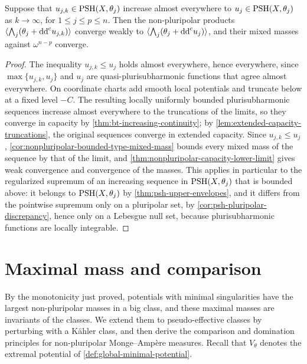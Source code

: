 \begin{corollary}\label{cor:nonpluripolar-increasing-continuity}
Suppose that $u_{j,k}\in\mathrm{PSH}(X,\theta_j)$ increase almost everywhere to $u_j\in\mathrm{PSH}(X,\theta_j)$ as $k\to\infty$, for $1\leq j\leq p\leq n$. Then the non-pluripolar products $\langle\bigwedge_j(\theta_j+\mathrm{dd}^{\mathrm{c}} u_{j,k})\rangle$ converge weakly to $\langle\bigwedge_j(\theta_j+\mathrm{dd}^{\mathrm{c}} u_j)\rangle$, and their mixed masses against $\omega^{n-p}$ converge.
\end{corollary}
\begin{proof}
The inequality $u_{j,k}\leq u_j$ holds almost everywhere, hence everywhere, since $\max\{u_{j,k},u_j\}$ and $u_j$ are quasi-plurisubharmonic functions that agree almost everywhere. On coordinate charts add smooth local potentials and truncate below at a fixed level $-C$. The resulting locally uniformly bounded plurisubharmonic sequences increase almost everywhere to the truncations of the limits, so they converge in capacity by \cref{thm:bt-increasing-continuity}; by \cref{lem:extended-capacity-truncations}, the original sequences converge in extended capacity. Since $u_{j,k}\leq u_j$, \cref{cor:nonpluripolar-bounded-type-mixed-mass} bounds every mixed mass of the sequence by that of the limit, and \cref{thm:nonpluripolar-capacity-lower-limit} gives weak convergence and convergence of the masses. This applies in particular to the regularized supremum of an increasing sequence in $\mathrm{PSH}(X,\theta_j)$ that is bounded above: it belongs to $\mathrm{PSH}(X,\theta_j)$ by \cref{thm:psh-upper-envelopes}, and it differs from the pointwise supremum only on a pluripolar set, by \cref{cor:psh-pluripolar-discrepancy}, hence only on a Lebesgue null set, because plurisubharmonic functions are locally integrable.
\end{proof}

\section{Maximal mass and comparison}
\label{sec:nonpluripolar-full-mass}
By the monotonicity just proved, potentials with minimal singularities have the largest non-pluripolar masses in a big class, and these maximal masses are invariants of the classes. We extend them to pseudo-effective classes by perturbing with a K\"ahler class, and then derive the comparison and domination principles for non-pluripolar Monge--Amp\`ere measures. Recall that $V_\theta$ denotes the extremal potential of \cref{def:global-minimal-potential}.

